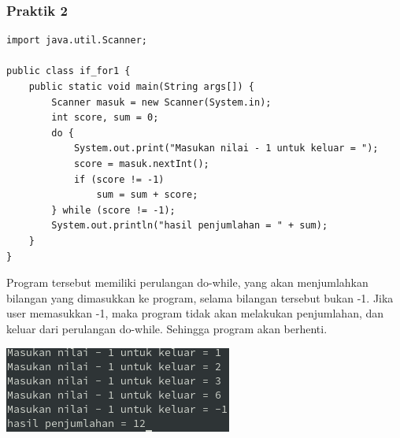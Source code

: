 \documentclass[a4paper,12pt]{article}
\begin{document}
\subsubsection{Praktik 2}
\begin{lstlisting}
import java.util.Scanner;

public class if_for1 {
    public static void main(String args[]) {
        Scanner masuk = new Scanner(System.in);
        int score, sum = 0;
        do {
            System.out.print("Masukan nilai - 1 untuk keluar = ");
            score = masuk.nextInt();
            if (score != -1)
                sum = sum + score;
        } while (score != -1);
        System.out.println("hasil penjumlahan = " + sum);
    }
}
\end{lstlisting}
Program tersebut memiliki perulangan do-while, yang akan menjumlahkan bilangan yang dimasukkan ke program, selama
bilangan tersebut bukan -1. Jika user memasukkan -1, maka program tidak akan melakukan penjumlahan, dan keluar dari
perulangan do-while. Sehingga program akan berhenti.
\begin{center}
    \includegraphics[scale=.8]{2.png}
\end{center}
\end{document}
